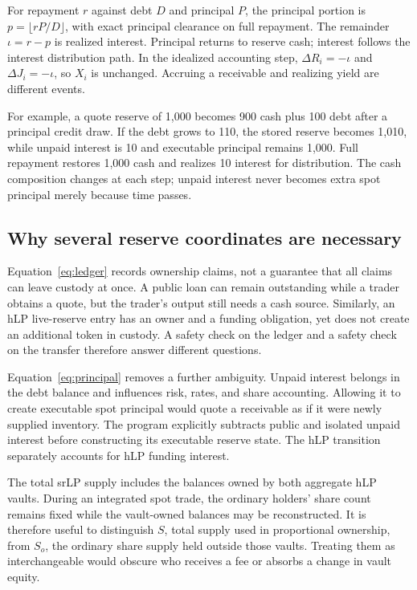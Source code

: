 For repayment $r$ against debt $D$ and principal $P$, the principal portion is $p=\lfloor rP/D\rfloor$, with exact principal clearance on full repayment. The remainder $\iota=r-p$ is realized interest. Principal returns to reserve cash; interest follows the interest distribution path. In the idealized accounting step, $\Delta R_i=-\iota$ and $\Delta J_i=-\iota$, so $X_i$ is unchanged. Accruing a receivable and realizing yield are different events.

For example, a quote reserve of 1,000 becomes 900 cash plus 100 debt after a principal credit draw. If the debt grows to 110, the stored reserve becomes 1,010, while unpaid interest is 10 and executable principal remains 1,000. Full repayment restores 1,000 cash and realizes 10 interest for distribution. The cash composition changes at each step; unpaid interest never becomes extra spot principal merely because time passes.

\ifexpanded
\subsection{Why several reserve coordinates are necessary}

Equation~\eqref{eq:ledger} records ownership claims, not a guarantee that all claims can leave custody at once. A public loan can remain outstanding while a trader obtains a quote, but the trader's output still needs a cash source. Similarly, an hLP live-reserve entry has an owner and a funding obligation, yet does not create an additional token in custody. A safety check on the ledger and a safety check on the transfer therefore answer different questions.

Equation~\eqref{eq:principal} removes a further ambiguity. Unpaid interest belongs in the debt balance and influences risk, rates, and share accounting. Allowing it to create executable spot principal would quote a receivable as if it were newly supplied inventory. The program explicitly subtracts public and isolated unpaid interest before constructing its executable reserve state. The hLP transition separately accounts for hLP funding interest.

The total srLP supply includes the balances owned by both aggregate hLP vaults. During an integrated spot trade, the ordinary holders' share count remains fixed while the vault-owned balances may be reconstructed. It is therefore useful to distinguish $S$, total supply used in proportional ownership, from $S_o$, the ordinary share supply held outside those vaults. Treating them as interchangeable would obscure who receives a fee or absorbs a change in vault equity.
\fi

